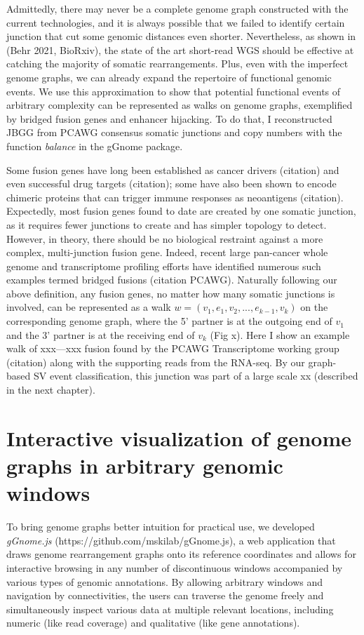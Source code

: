 \documentclass[phd,tocprelim]{cornell}
\begin{document}
Admittedly, there may never be a complete genome graph constructed with the current technologies, and it is always possible that we failed to identify certain junction that cut some genomic distances even shorter. Nevertheless, as shown in (Behr 2021, BioRxiv), the state of the art short-read WGS should be effective at catching the majority of somatic rearrangements. Plus, even with the imperfect genome graphs, we can already expand the repertoire of functional genomic events. We use this approximation to show that potential functional events of arbitrary complexity can be represented as walks on genome graphs, exemplified by bridged fusion genes and enhancer hijacking. To do that, I reconstructed JBGG from PCAWG consensus somatic junctions and copy numbers with the function \textit{balance} in the gGnome package.

Some fusion genes have long been established as cancer drivers (citation) and even successful drug targets (citation); some have also been shown to encode chimeric proteins that can trigger immune responses as neoantigens (citation). Expectedly, most fusion genes found to date are created by one somatic junction, as it requires fewer junctions to create and has simpler topology to detect. However, in theory, there should be no biological restraint against a more complex, multi-junction fusion gene. Indeed, recent large pan-cancer whole genome and transcriptome profiling efforts have identified numerous such examples termed bridged fusions (citation PCAWG). Naturally following our above definition, any fusion genes, no matter how many somatic junctions is involved, can be represented as a walk $w = (v_1, e_1, v_2, ..., e_{k-1}, v_k)$ on the corresponding genome graph, where the 5’ partner is at the outgoing end of $v_1$ and the 3’ partner is at the receiving end of $v_k$ (Fig x). Here I show an example walk of xxx—xxx fusion found by the PCAWG Transcriptome working group (citation) along with the supporting reads from the RNA-seq. By our graph-based SV event classification, this junction was part of a large scale xx (described in the next chapter).

\section{Interactive visualization of genome graphs in arbitrary genomic windows}
To bring genome graphs better intuition for practical use, we developed \textit{gGnome.js} (https://github.com/mskilab/gGnome.js), a web application that draws genome rearrangement graphs onto its reference coordinates and allows for interactive browsing in any number of discontinuous windows accompanied by various types of genomic annotations. By allowing arbitrary windows and navigation by connectivities, the users can traverse the genome freely and simultaneously inspect various data at multiple relevant locations, including numeric (like read coverage) and qualitative (like gene annotations).
\end{document}
